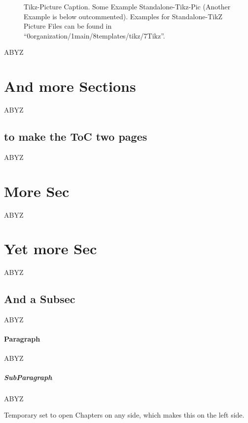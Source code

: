 \np
%
\begin{figure}[!htpb]
	\centering
	\caption{Tikz-Picture Caption. Some Example Standalone-Tikz-Pic (Another Example is below outcommented). Examples for Standalone-TikZ Picture Files can be found in \enquote{0organization/1main/8templates/tikz/7Tikz}.}
	\label{fig:tikz_test}
\end{figure}
%
%
%
%
 


\setcounter{\DenKrHeadingTopLvl}{9}
 ABYZ
\section{And more Sections} ABYZ
\subsection{to make the ToC two pages} ABYZ
\section{More Sec} ABYZ
\section{Yet more Sec} ABYZ
\subsection{And a Subsec} ABYZ
\paragraph{Paragraph} ABYZ
\subparagraph{SubParagraph} ABYZ





\headingOpenTempAny%
\headingOpenTempRestore%

Temporary set to open Chapters on any side, which makes this on the left side.